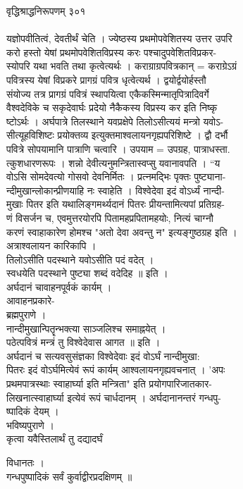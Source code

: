 \documentclass[11pt, openany]{book}
\begin{document}
{{{{{{{{{{{{{ वृद्धिश्राद्धनिरूपणम् \textbar{} ३०१\\
~\\
यज्ञोपवीतित्वं, देवतीर्थं चेति । ज्येष्ठस्य प्रथमोपवेशितस्य उत्तर उपरि\\
करो हस्तो येषां }{प्रथमोपवेशितविप्रस्य}{ करः }{पश्चादुपवेशितविप्रकर-}{\\
स्योपरि यथा भवति तथा कृत्वेत्यर्थः । कराग्राग्रपवित्रकान् =
कराग्रेऽग्रं\\
पवित्रस्य येषां विप्रकरे प्रागग्रं पवित्र धृत्वेत्यर्थ ।
द्वयोर्द्वयोर्हस्तौ\\
संयोज्य तत्र प्रागग्रं पवित्रं स्थापयित्वा
एकैकस्मिन्मातृपित्रादिवर्गे\\
वैश्वदेविके च सकृदेवार्घः प्रदेयो नैकैकस्य विप्रस्य कर इति निष्कृ\\
ष्टोऽर्थः । अर्घपात्रे तिलस्थाने यवप्रक्षेपे तिलोऽसीत्ययं मन्त्रो
यवोऽ-\\
सीत्यूहविशिष्टः प्रयोक्तव्य इत्युक्तमाश्वलायनगृह्यपरिशिष्टे । द्वौ
}{दर्भौ}{\\
पवित्रे सोपयामानि पात्राणि चत्वारि । उपयाम = उपग्रह, }{पात्राधस्ता.}{\\
त्कुशधारणरूपः । शन्नो देवीत्यनुमन्त्रितास्वप्सु }{यवानावपति}{ । ``य\\
वोऽसि सोमदेवत्यो गोसवो देवनिर्मितः । प्रत्नमद्भिः पृक्तः
पुष्ट्याना-\\
न्दीमुखान्लोकान्प्रीणयाहि नः स्वाहेति । विश्वेदेवा इदं वोऽर्ध्यं
नान्दी-\\
मुखाः पितर इति यथालिङ्गमर्थ्यदानं पितरः प्रीयन्तामित्यपां प्रतिग्रह-\\
णं विसर्जन च, एवमुत्तरयोरपि पितामहप्रपितामहयोः, नित्यं चाग्नौ\\
करणं स्वाहाकारेण होमश्च "अतो देवा अवन्तु न" इत्यङ्गुष्ठग्रह इति ।\\
अत्राश्वलायन कारिकापि ।\\
तिलोऽसीति पदस्थाने }{यवोऽसीति}{ पदं वदेत् ।\\
स्वधयेति पदस्थाने }{पुष्ट्या}{ शब्दं वदेदिह ॥ इति ।\\
}{अर्घदानं}{ चावाहनपूर्वकं कार्यम् ।\\
आवाहनप्रकारे-\\
ब्रह्मपुराणे ।\\
}{नान्दीमुखान्पितॄन्भक्त्या}{ साञ्जलिश्च }{समाह्नयेत्}{ ।\\
पठेत्पवित्रं मन्त्रं तु विश्वेदेवास आगत ॥ इति ।\\
अर्घदानं च सत्यवसुसंज्ञका विश्वेदेवाः इदं वोऽर्घं
नान्दीमुखा:\\
पितरः इदं वोऽर्घमित्येवं रूपं कार्यम् आश्वलायनगृह्यवचनात् । 'अपः\\
प्रथमपात्रस्थाः }{स्वाहार्घ्या}{ इति मन्त्रिता" इति प्रयोगपारिजातकार-\\
लिखनात्स्वाहार्घ्या इत्येवं रूपं चार्धदानम् । अर्घदानानन्तरं
गन्धपु-\\
}{ष्पादिकं}{ देयम् ।\\
भविष्यपुराणे ।\\
}{कृत्वा यवैस्तिलार्थं}{ तु }{दद्यादर्घं}{ विधानतः ।\\
गन्धपुष्पादिकं सर्वं कुर्वाद्वीरप्रदक्षिणम् ॥

}}}}}}}}}}}}}
\end{document}
